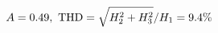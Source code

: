 \documentclass[preview]{standalone}
\begin{document}
\begin{align*}
\special{dvisvgm:raw <g id='unique000'>}A=0.49,\ \text{THD}=\sqrt{H_2^2+H_3^2}/H_1=9.4\%\special{dvisvgm:raw </g>}
\end{align*}
\end{document}
